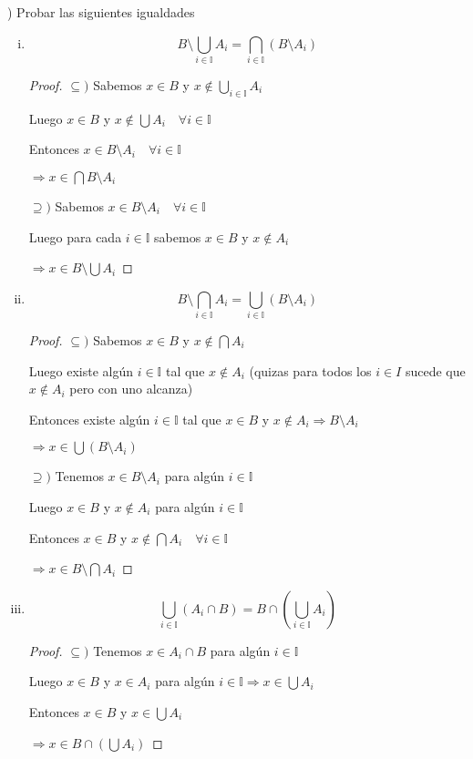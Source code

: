 \documentclass[12pt]{article}
\newcommand{\I}{\mathbb{I}}
\newcommand{\Ra}{\Rightarrow}
\theoremstyle{definition}
\begin{document}
) Probar las siguientes igualdades
\begin{enumerate}[i.]
  \item $$B \setminus \bigcup_{i \in \I} A_{i} = \bigcap_{i \in \I} (B \setminus A_{i})$$
    \begin{proof}
    
    $\subseteq )$ Sabemos $x \in B $ y $x \notin \bigcup_{i \in \I} A_{i}$ 

    Luego $x \in B$ y $x \notin \bigcup A_{i} \quad \forall i \in \I $

    Entonces $x \in B \setminus A_{i} \quad \forall i \in \I$

    $\Ra x \in \bigcap B \setminus A_{i}$

    $\supseteq )$ Sabemos $x \in B \setminus A_{i} \quad \forall i \in \I$

    Luego para cada $i \in \I$ sabemos $x \in B$ y $x \notin A_{i}$

    $\Ra x \in B \setminus \bigcup A_{i}$
    
    \end{proof}
  \item $$B \setminus \bigcap_{i \in \I} A_{i} = \bigcup_{i \in \I} (B \setminus A_{i})$$
    \begin{proof}

    	$\subseteq )$ Sabemos $x \in B $ y $x \notin \bigcap A_{i}$ 

    	Luego existe algún $i \in \I$ tal que $x \notin A_{i}$ (quizas para todos los $i \in I$ sucede que $x \notin A_{i}$ pero con uno alcanza)

    	Entonces existe algún $i \in \I$ tal que $x \in B$ y $x \notin A_{i} \Ra B \setminus A_{i} $

    	$\Ra x \in \bigcup (B \setminus A_{i})$

    	$\supseteq )$ Tenemos $x \in B \setminus A_{i}$ para algún $i \in \I$

    	Luego $x \in B$ y $x \notin A_{i}$ para algún $i \in \I$

    	Entonces $x \in B$ y $x \notin \bigcap A_{i} \quad \forall i \in \I$

    	$\Ra x \in B \setminus \bigcap A_{i}$
    
    \end{proof}
  \item $$\bigcup_{i \in \I} (A_{i} \cap B) = B \cap (\bigcup_{i \in \I} A_{i})$$
    \begin{proof}
    $\subseteq )$ Tenemos $x \in A_{i} \cap B$ para algún $i \in \I$  
    
    Luego $x \in B$ y $x \in A_{i}$ para algún $i \in \I \Ra x \in \bigcup A_{i}$

    Entonces $x \in B$ y $x \in \bigcup A_{i}$

    $\Ra x \in B \cap (\bigcup A_{i})$
    \end{proof}
\end{enumerate}
\end{document}
